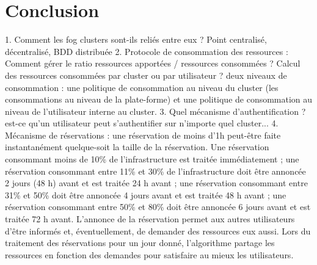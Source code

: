 \documentclass[letterpaper, 10 pt, conference]{ieeeconf}
\begin{document}
\section{Conclusion}
1. Comment les fog clusters sont-ils reliés entre eux ? Point centralisé, décentralisé, BDD distribuée
2. Protocole de consommation des ressources : Comment gérer le ratio ressources apportées / ressources consommées ? Calcul des ressources consommées par cluster ou par utilisateur ?
deux niveaux de consommation : une politique de consommation au niveau du cluster (les consommations au niveau de la plate-forme) et une politique de consommation au niveau de l'utilisateur interne au cluster.
3. Quel mécanisme d'authentification ? est-ce qu'un utilisateur peut s'authentifier sur n'importe quel cluster...
4. Mécanisme de réservations : une réservation de moins d'1h peut-être faite instantanément quelque-soit la taille de la réservation. Une réservation consommant moins de 10\% de l'infrastructure
est traitée immédiatement ; une réservation consommant entre 11\% et 30\% de l'infrastructure doit être annoncée 2 jours (48 h) avant et est traitée 24 h avant ; une réservation consommant entre 31\% et 50\% doit être annoncée 4 jours avant et est traitée 48 h avant ; une réservation consommant entre 50\% et 80\% doit être annoncée 6 jours avant et est traitée 72 h avant. L'annonce de la réservation permet aux autres utilisateurs d'être informés et, éventuellement, de demander des ressources eux aussi. Lors du traitement des réservations pour un jour donné, l'algorithme partage les ressources en fonction des demandes pour satisfaire au mieux les utilisateurs.





\clearpage
\end{document}
